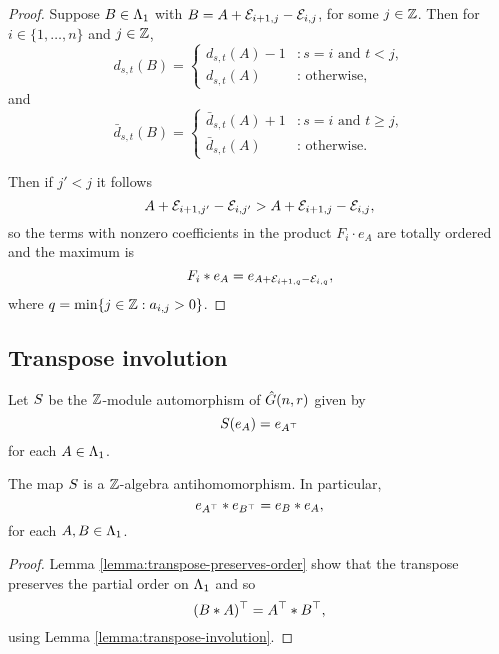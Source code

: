 \documentclass[a4paper, 11pt]{report}
\begin{document}
\begin{proof}
Suppose $B\in\Lambda_1{}$ with $B=A+\mathcal{E}_{i+1,j}-\mathcal{E}_{i,j}$, for some $j\in\mathbb{Z}$. Then for $i\in\{1,\ldots,n\}$ and $j\in\mathbb{Z}$,
\begin{equation*}
d_{s,t}{(B)} = \begin{cases}
d_{s,t}{(A)} - 1 &: s=i \text{ and } t<j,\\
d_{s,t}{(A)} &: \text{ otherwise,}
\end{cases}
\end{equation*}
and
\begin{equation*}
\bar{d}_{s,t}{(B)} = \begin{cases}
\bar{d}_{s,t}{(A)} + 1 &: s=i \text{ and } t\geq j,\\
\bar{d}_{s,t}{(A)} &: \text{ otherwise.}
\end{cases}
\end{equation*}

Then if $j'<j$ it follows
\begin{equation*}
A+\mathcal{E}_{i+1,j'}-\mathcal{E}_{i,j'} > A+\mathcal{E}_{i+1,j}-\mathcal{E}_{i,j},
\end{equation*}
so the terms with nonzero coefficients in the product $F_i\cdot e_A$ are totally ordered and the maximum is
\begin{equation*}
F_i\ast e_A = e_{A+\mathcal{E}_{i+1,q}-\mathcal{E}_{i,q}},
\end{equation*}
where $q=\min\{j\in\mathbb{Z}:a_{i,j}>0\}$.
\end{proof}

\subsection{Transpose involution}

Let $S{}$ be the $\mathbb{Z}$-module automorphism of $\hat{G}(n,r)$ given by
\begin{equation*}
S{(e_A)}=e_{A^\top}
\end{equation*}
for each $A\in\Lambda_1{}$.

\begin{lemma}\label{lemma:transpose-involution-generic}
The map $S{}$ is a $\mathbb{Z}$-algebra antihomomorphism. In particular,
\begin{equation*}
e_{A^\top}\ast e_{B^\top} = e_B\ast e_A,
\end{equation*}
for each $A,B\in\Lambda_1{}$.
\end{lemma}

\begin{proof}
Lemma \ref{lemma:transpose-preserves-order} show that the transpose preserves the partial order on $\Lambda_1{}$ and so
\begin{equation*}
(B\ast A)^\top = A^\top\ast B^\top,
\end{equation*}
using Lemma \ref{lemma:transpose-involution}.
\end{proof}
\end{document}
